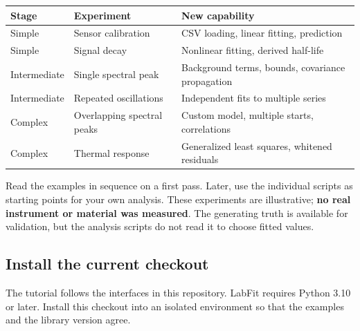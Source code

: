 \documentclass[
  british,
  10pt,
  a4paper,
]{article}
\begin{document}
\begin{longtable}[]{@{}
  >{\raggedright\arraybackslash}p{}
  >{\raggedright\arraybackslash}p{}
  >{\raggedright\arraybackslash}p{}@{}}
\toprule\noalign{}
\begin{minipage}[b]{\linewidth}\raggedright
Stage
\end{minipage} & \begin{minipage}[b]{\linewidth}\raggedright
Experiment
\end{minipage} & \begin{minipage}[b]{\linewidth}\raggedright
New capability
\end{minipage} \\
\midrule\noalign{}
\endhead
\bottomrule\noalign{}
\endlastfoot
Simple & Sensor calibration & CSV loading, linear fitting, prediction \\
Simple & Signal decay & Nonlinear fitting, derived half-life \\
Intermediate & Single spectral peak & Background terms, bounds,
covariance propagation \\
Intermediate & Repeated oscillations & Independent fits to multiple
series \\
Complex & Overlapping spectral peaks & Custom model, multiple starts,
correlations \\
Complex & Thermal response & Generalized least squares, whitened
residuals \\
\end{longtable}

Read the examples in sequence on a first pass. Later, use the individual
scripts as starting points for your own analysis. These experiments are
illustrative; \textbf{no real instrument or material was measured}. The
generating truth is available for validation, but the analysis scripts
do not read it to choose fitted values.


\subsection{Install the current
checkout}\label{install-the-current-checkout}

The tutorial follows the interfaces in this repository. LabFit requires
Python 3.10 or later. Install this checkout into an isolated environment
so that the examples and the library version agree.
\end{document}
